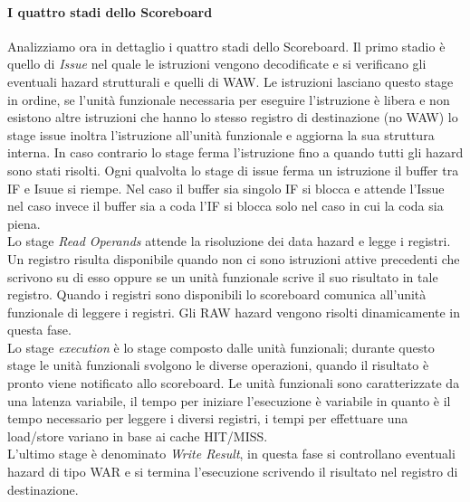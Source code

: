 \paragraph{I quattro stadi dello Scoreboard}
Analizziamo ora in dettaglio i quattro stadi dello Scoreboard. Il primo stadio è quello di \emph{Issue} nel quale le istruzioni vengono decodificate e si verificano gli eventuali hazard strutturali e quelli di WAW. Le istruzioni lasciano questo stage in ordine, se l'unità funzionale necessaria per eseguire l'istruzione è libera e non esistono altre istruzioni che hanno lo stesso registro di destinazione (no WAW) lo stage issue inoltra l'istruzione all'unità funzionale e aggiorna la sua struttura interna. In caso contrario lo stage ferma l'istruzione fino a quando tutti gli hazard sono stati risolti. Ogni qualvolta lo stage di issue ferma un istruzione il buffer tra IF e Isuue si riempe. Nel caso il buffer sia singolo IF si blocca e attende l'Issue nel caso invece il buffer sia a coda l'IF si blocca solo nel caso in cui la coda sia piena.\\
Lo stage \emph{Read Operands} attende la risoluzione dei data hazard e legge i registri. Un registro risulta disponibile quando non ci sono istruzioni attive precedenti che scrivono su di esso oppure se un unità funzionale scrive il suo risultato in tale registro. Quando i registri sono disponibili lo scoreboard comunica all'unità funzionale di leggere i registri. Gli RAW hazard vengono risolti dinamicamente in questa fase.\\
Lo stage \emph{execution} è lo stage composto dalle unità funzionali; durante questo stage le unità funzionali svolgono le diverse operazioni, quando il risultato è pronto viene notificato allo scoreboard. Le unità funzionali sono caratterizzate da una latenza variabile, il tempo per iniziare l'esecuzione è variabile in quanto è il tempo necessario per leggere i diversi registri, i tempi per effettuare una load/store variano in base ai cache HIT/MISS.\\
L'ultimo stage è denominato \emph{Write Result}, in questa fase si controllano eventuali hazard di tipo WAR e si termina l'esecuzione scrivendo il risultato nel registro di destinazione.
